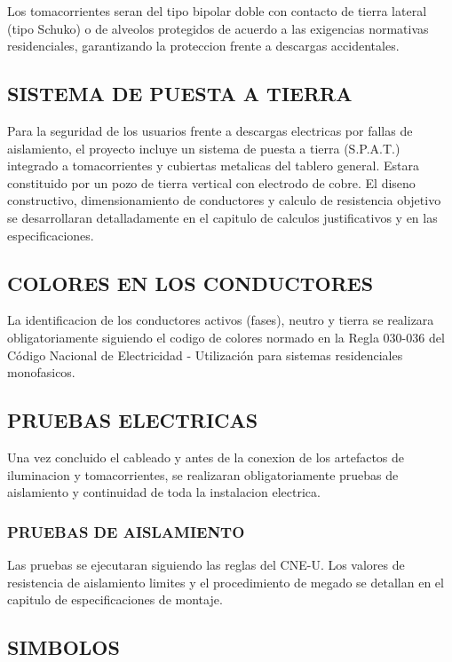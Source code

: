 Los tomacorrientes seran del tipo bipolar doble con contacto de tierra lateral (tipo Schuko) o de alveolos protegidos de acuerdo a las exigencias normativas residenciales, garantizando la proteccion frente a descargas accidentales.

\subsection{SISTEMA DE PUESTA A TIERRA}

Para la seguridad de los usuarios frente a descargas electricas por fallas de aislamiento, el proyecto incluye un sistema de puesta a tierra (S.P.A.T.) integrado a tomacorrientes y cubiertas metalicas del tablero general. Estara constituido por un pozo de tierra vertical con electrodo de cobre.
El diseno constructivo, dimensionamiento de conductores y calculo de resistencia objetivo se desarrollaran detalladamente en el capitulo de calculos justificativos y en las especificaciones.

\subsection{COLORES EN LOS CONDUCTORES}

La identificacion de los conductores activos (fases), neutro y tierra se realizara obligatoriamente siguiendo el codigo de colores normado en la Regla 030-036 del Código Nacional de Electricidad - Utilización para sistemas residenciales monofasicos.

\subsection{PRUEBAS ELECTRICAS}

Una vez concluido el cableado y antes de la conexion de los artefactos de iluminacion y tomacorrientes, se realizaran obligatoriamente pruebas de aislamiento y continuidad de toda la instalacion electrica.

\subsubsection{PRUEBAS DE AISLAMIENTO}

Las pruebas se ejecutaran siguiendo las reglas del CNE-U. Los valores de resistencia de aislamiento limites y el procedimiento de megado se detallan en el capitulo de especificaciones de montaje.

\subsection{SIMBOLOS}

